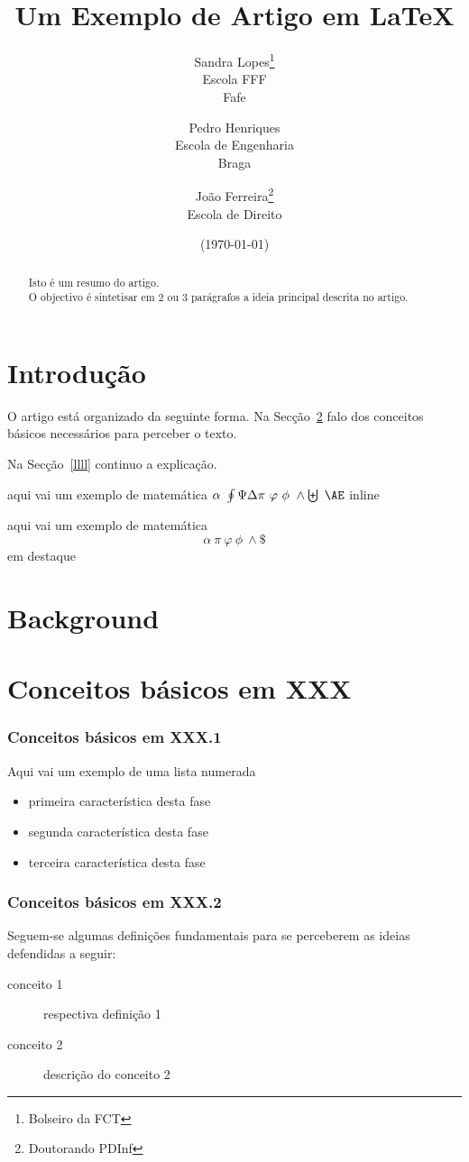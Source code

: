 \documentclass{article}
\title{Um Exemplo de Artigo em \LaTeX}
\author{Sandra Lopes\thanks{Bolseiro da FCT}\\Escola FFF\\ Fafe
        \and
        Pedro Henriques\\Escola de Engenharia\\ Braga
        \and João Ferreira\thanks{Doutorando PDInf}\\ Escola de Direito }
\date{ (\today)}
\begin{document}
\maketitle

\begin{abstract}
\noindent Isto é um resumo do artigo.\\
O objectivo é sintetisar em 2 ou 3 parágrafos a ideia principal descrita no artigo.
\end{abstract}

\tableofcontents

\section{Introdução} \label{intro}

O artigo está organizado da seguinte forma.
Na Secção~\ref{backg} falo dos conceitos básicos necessários para perceber o texto.

Na Secção~\ref{llll} continuo a explicação.


aqui vai um exemplo de matemática $\alpha\   \oint   \Psi \Delta \pi \  \varphi\ \phi\ \wedge \biguplus\ {\AE}  $ inline

aqui vai um exemplo de matemática \[ \alpha\   \pi \  \varphi\ \phi\ \wedge \$ \] em destaque


\section{Background} \label{backg}
\section{Conceitos básicos em XXX}
\subsubsection{Conceitos básicos em XXX.1}
Aqui vai um exemplo de uma lista numerada
\begin{itemize}
\item primeira característica desta fase
\item segunda característica desta fase
\item terceira característica desta fase
\end{itemize}

\subsubsection{Conceitos básicos em XXX.2}
Seguem-se algumas definições fundamentais para se perceberem as ideias
defendidas a seguir:
\begin{description}
\item[conceito 1] respectiva definição 1
\item[conceito 2] descrição do  conceito 2
\end{description}
\end{document}
